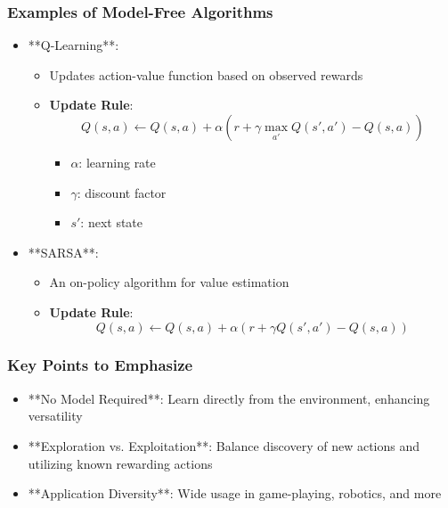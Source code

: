 \documentclass[aspectratio=169]{beamer}
\begin{document}
\begin{frame}[fragile]
    \frametitle{Examples of Model-Free Algorithms}
    \begin{itemize}
        \item **Q-Learning**: 
        \begin{itemize}
            \item Updates action-value function based on observed rewards
            \item \textbf{Update Rule}:
            \begin{equation}
                Q(s, a) \gets Q(s,a) + \alpha \left( r + \gamma \max_{a'} Q(s', a') - Q(s,a) \right)
            \end{equation}
            \begin{itemize}
                \item $\alpha$: learning rate
                \item $\gamma$: discount factor
                \item $s'$: next state
            \end{itemize}
        \end{itemize}
        \item **SARSA**:
        \begin{itemize}
            \item An on-policy algorithm for value estimation
            \item \textbf{Update Rule}:
            \begin{equation}
                Q(s, a) \gets Q(s,a) + \alpha \left( r + \gamma Q(s', a') - Q(s,a) \right)
            \end{equation}
        \end{itemize}
    \end{itemize}
\end{frame}

\begin{frame}[fragile]
    \frametitle{Key Points to Emphasize}
    \begin{itemize}
        \item **No Model Required**: Learn directly from the environment, enhancing versatility
        \item **Exploration vs. Exploitation**: Balance discovery of new actions and utilizing known rewarding actions
        \item **Application Diversity**: Wide usage in game-playing, robotics, and more
    \end{itemize}
\end{frame}
\end{document}
